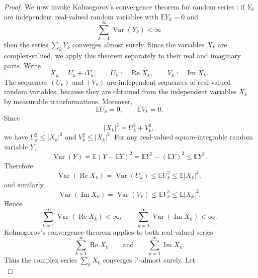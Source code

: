 \documentclass[11pt]{amsart}
\numberwithin{equation}{section}
\newcommand{\func}[1]{\operatorname{#1}}
\begin{document}
\begin{proof}
We now invoke Kolmogorov's convergence theorem for random series \cite[%
Theorem~2.5.6]{Durrett2019}: if $Y_k$ are independent real-valued random
variables with $\mathbb{E }Y_k=0$ and 
\begin{equation*}
\sum_{k=1}^{\infty}\func{Var}(Y_k)<\infty
\end{equation*}
then the series $\sum_k Y_k$ converges almost surely. Since the variables $%
X_k$ are complex-valued, we apply this theorem separately to their real and
imaginary parts. Write 
\begin{equation*}
X_k = U_k + iV_k, \qquad U_k := \func{Re} X_k, \qquad V_k := \func{Im} X_k.
\end{equation*}
The sequences $(U_k)$ and $(V_k)$ are independent sequences of real-valued
random variables, because they are obtained from the independent variables $%
X_k$ by measurable transformations. Moreover, 
\begin{equation*}
\mathbb{E }U_k=0, \qquad \mathbb{E }V_k=0.
\end{equation*}
Since 
\begin{equation*}
\left|X_k\right|^2=U_k^2+V_k^2,
\end{equation*}
we have $U_k^2\le \left|X_k\right|^2$ and $V_k^2\le \left|X_k\right|^2$. For
any real-valued square-integrable random variable $Y$, 
\begin{equation*}
\func{Var}(Y) = \mathbb{E}(Y-\mathbb{E}Y)^2 = \mathbb{E}Y^2-(\mathbb{E}Y)^2
\le \mathbb{E}Y^2.
\end{equation*}
Therefore 
\begin{equation*}
\func{Var}(\func{Re} X_k) = \func{Var}(U_k) \le \mathbb{E}U_k^2 \le \mathbb{E%
}|X_k|^2,
\end{equation*}
and similarly 
\begin{equation*}
\func{Var}(\func{Im} X_k) = \func{Var}(V_k) \le \mathbb{E}V_k^2 \le \mathbb{E%
}|X_k|^2.
\end{equation*}
Hence 
\begin{equation*}
\sum_{k=1}^{\infty}\func{Var}(\func{Re} X_k)<\infty, \qquad
\sum_{k=1}^{\infty}\func{Var}(\func{Im} X_k)<\infty.
\end{equation*}
Kolmogorov's convergence theorem applies to both real-valued series 
\begin{equation*}
\sum_{k=1}^{\infty}\func{Re} X_k \qquad\text{and}\qquad \sum_{k=1}^{\infty}%
\func{Im} X_k.
\end{equation*}
Thus the complex series $\sum_k X_k$ converges $\mathbb{P}$-almost surely.
Let 
\begin{equation*}

\end{equation*}
\end{proof}
\end{document}
